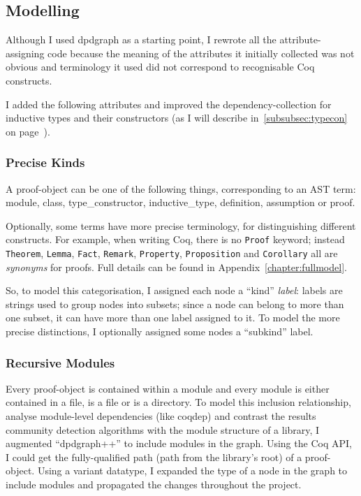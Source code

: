 \subsection{Modelling}\label{subsec:modelling}

Although I used dpdgraph as a starting point, I rewrote all the
attribute-assigning code because the meaning of the attributes it initially
collected was not obvious and terminology it used did not correspond to
recognisable Coq constructs.

I added the following attributes and improved the dependency-collection for
inductive types and their constructors (as I will describe
in~\ref{subsubsec:typecon}~ on
page~\pageref{subsubsec:typecon}).

\subsubsection{Precise Kinds}\label{subsubsec:kinds}

A proof-object can be one of the following things, corresponding to an AST term:
\textsf{module}, \textsf{class}, \textsf{type\_constructor},
\textsf{inductive\_type}, \textsf{definition}, \textsf{assumption} or
\textsf{proof}.

Optionally, some terms have more precise terminology, for distinguishing
different constructs. For example, when writing Coq, there is no \texttt{Proof}
keyword; instead \texttt{Theorem}, \texttt{Lemma}, \texttt{Fact},
\texttt{Remark}, \texttt{Property}, \texttt{Proposition} and \texttt{Corollary}
all are \emph{synonyms} for proofs. Full details can be found in
Appendix~\ref{chapter:fullmodel}.

So, to model this categorisation, I assigned each node a ``kind'' \emph{label}:
labels are strings used to group nodes into subsets; since a node can belong to
more than one subset, it can have more than one label assigned to it. To model
the more precise distinctions, I optionally assigned some nodes a ``subkind''
label.

\subsubsection{Recursive Modules}\label{subsubsec:recmodules}

Every proof-object is contained within a module and every module is either
contained in a file, is a file or is a directory. To model this inclusion
relationship, analyse module-level dependencies (like coqdep) and contrast the
results community detection algorithms with the module structure of a library, I
augmented ``dpdgraph++'' to include modules in the graph. Using the Coq API, I
could get the fully-qualified path (path from the library's root) of a
proof-object. Using a variant datatype, I expanded the type of a node in the
graph to include modules and propagated the changes throughout the project.

